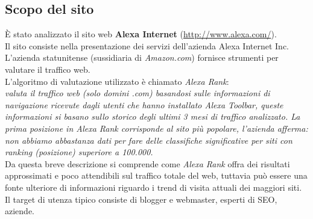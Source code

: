\subsection{Scopo del sito}
È stato analizzato il sito web \textbf{Alexa Internet} (\url{http://www.alexa.com/}). \\
Il sito consiste nella presentazione dei servizi dell'azienda Alexa Internet Inc. \\
L'azienda statunitense (sussidiaria di \textit{Amazon.com}) fornisce 
strumenti per valutare il traffico web. \\
L'algoritmo di valutazione utilizzato è chiamato \textit{Alexa Rank}: \\
\textit{valuta il traffico web (solo domini .com) basandosi sulle informazioni di navigazione ricevute dagli utenti che 
hanno installato Alexa Toolbar, queste informazioni si basano sullo 
storico degli ultimi 3 mesi di traffico analizzato.
La prima posizione in Alexa Rank corrisponde al sito più popolare, 
l'azienda afferma: non abbiamo abbastanza dati per fare delle classifiche 
significative per siti con ranking (posizione) superiore a 100.000.} \\
Da questa breve descrizione si comprende come \textit{Alexa Rank} offra dei risultati approssimati e poco attendibili sul traffico totale del web, tuttavia può 
essere una fonte ulteriore di informazioni riguardo i trend di visita attuali dei maggiori siti.\\ 
Il target di utenza tipico consiste di blogger e webmaster, esperti di SEO, 
aziende.
